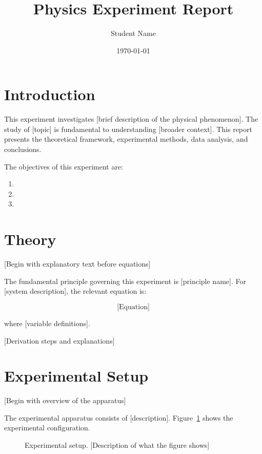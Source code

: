 \documentclass[12pt,a4paper]{article}
\title{Physics Experiment Report}
\author{Student Name}
\date{\today}
\begin{document}
\maketitle


\section{Introduction}
\label{sec:introduction}

This experiment investigates [brief description of the physical phenomenon]. The study of [topic] is fundamental to understanding [broader context]. This report presents the theoretical framework, experimental methods, data analysis, and conclusions.

The objectives of this experiment are:
\begin{enumerate}
    \item [First objective]
    \item [Second objective]
    \item [Third objective]
\end{enumerate}

\section{Theory}
\label{sec:theory}

[Begin with explanatory text before equations]

The fundamental principle governing this experiment is [principle name]. For [system description], the relevant equation is:

$$
\text{[Equation]}
$$

where [variable definitions].

[Derivation steps and explanations]

\section{Experimental Setup}
\label{sec:setup}

[Begin with overview of the apparatus]

The experimental apparatus consists of [description]. Figure~\ref{fig:setup} shows the experimental configuration.

\begin{figure}[h]
\centering
\caption{Experimental setup. [Description of what the figure shows]}
\label{fig:setup}
\end{figure}
\end{document}
